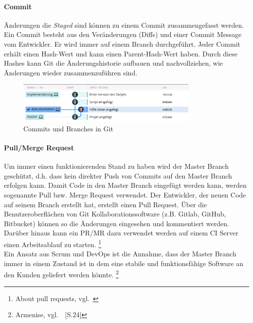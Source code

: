 \paragraph{Commit}

Änderungen die \textsl{Staged} sind können zu einem Commit zusammengefasst werden.
Ein Commit besteht aus den Veränderungen (Diffs) und einer Commit Message vom Entwickler.
Er wird immer auf einem Branch durchgeführt.
Jeder Commit erhält einen Hash-Wert und kann einen Parent-Hash-Wert haben.
Durch diese Hashes kann Git die Änderungshistorie aufbauen und nachvollziehen, wie Änderungen wieder zusammenzuführen sind.

\begin{figure}[htb]
    \centering
    \includegraphics[width=0.8\textwidth]{images/gitkraken_screenshot.png}
    \caption[Commits und Branches in Git]{Commits und Branches in Git}
    \label{fig:Screenshot aus dem Git Client GitKraken}
\end{figure}

\paragraph{Pull/Merge Request}

Um immer einen funktionierenden Stand zu haben wird der Master Branch geschützt, d.h. dass kein direkter Push von Commits auf den Master Branch erfolgen kann.
Damit Code in den Master Branch eingefügt werden kann, werden sogenannte Pull bzw. Merge Request verwendet.
Der Entwickler, der neuen Code auf seinem Branch erstellt hat, erstellt einen Pull Request.
Über die Benutzeroberflächen von Git Kollaborationssoftware (z.B. Gitlab, GitHub, Bitbucket) können so die Änderungen eingesehen und kommentiert werden.
Darüber hinaus kann ein PR/MR dazu verwendet werden auf einem CI Server einen Arbeitsablauf zu starten. \footnote{About pull requests, vgl.~\cite{GITHUB_ABOUT_PR}} \\

%

Ein Ansatz aus Scrum und DevOps ist die Annahme, dass der Master Branch immer in einem Zustand ist in dem eine stabile und funktionsfähige Software an den Kunden geliefert werden könnte.
\footnote{Armenise, vgl.~\cite{Armenise2015}~[S.24]}